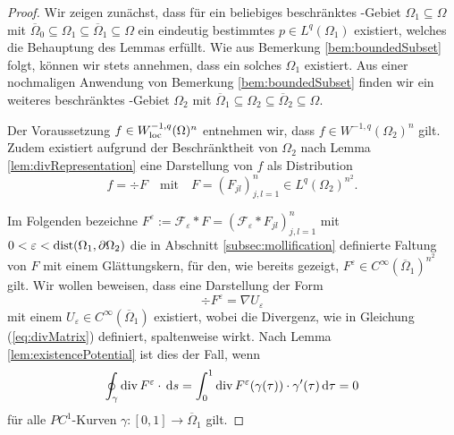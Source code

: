 \begin{proof}
  Wir zeigen zunächst, dass für ein beliebiges beschränktes \lipschitz\hyp{}Gebiet $\Omega_1 \subseteq \Omega$ mit $\overline\Omega_0 \subseteq \Omega_1 \subseteq \overline\Omega_1 \subseteq \Omega$ ein eindeutig bestimmtes $p \in L^q(\Omega_1)$ existiert, welches die Behauptung des Lemmas erfüllt.
  Wie aus Bemerkung \ref{bem:boundedSubset} folgt, können wir stets annehmen, dass ein solches $\Omega_1$ existiert.
  Aus einer nochmaligen Anwendung von Bemerkung \ref{bem:boundedSubset} finden wir ein weiteres beschränktes \lipschitz\hyp{}Gebiet $\Omega_2$ mit $\overline\Omega_1 \subseteq \Omega_2 \subseteq \overline\Omega_2 \subseteq \Omega$.

  Der Voraussetzung $f \in W_{\operatorname{loc}}^{-1,q}(\Omega)^n$ entnehmen wir, dass $f \in W^{-1,q}(\Omega_2)^n$ gilt. Zudem existiert aufgrund der Beschränktheit von $\Omega_2$ nach Lemma \ref{lem:divRepresentation} eine Darstellung von $f$ als Distribution
  \begin{equation}
    \label{eq:divRepresentation}
    f = \div F \quad\text{mit}\quad F = (F_{jl})_{j,l=1}^n \in L^q(\Omega_2)^{n^2}.
  \end{equation}

  Im Folgenden bezeichne $F^\varepsilon := \mathcal{F}_\varepsilon \ast F = (\mathcal{F}_\varepsilon \ast F_{jl})_{j,l=1}^n$ mit $0 < \varepsilon < \operatorname{dist}(\Omega_1, \partial\Omega_2)$ die in Abschnitt \ref{subsec:mollification} definierte Faltung von $F$ mit einem Glättungskern, für den, wie bereits gezeigt, $F^\varepsilon \in C^\infty(\overline\Omega_1)^{n^2}$ gilt.
  Wir wollen beweisen, dass eine Darstellung der Form
  \begin{equation}
    \label{eq:divNabla}
    \div F^\varepsilon = \nabla U_\varepsilon
  \end{equation}
  mit einem $U_\varepsilon \in C^\infty(\overline\Omega_1)$ existiert, wobei die Divergenz, wie in Gleichung (\ref{eq:divMatrix}) definiert, spaltenweise wirkt.
  Nach Lemma \ref{lem:existencePotential} ist dies der Fall, wenn
  $$
  \oint_\gamma \mathrm{div\,} F^\varepsilon \cdot \, {\operatorname{d}\!{s}} = \int_0^1 \mathrm{div\,} F^\varepsilon(\gamma(\tau))\cdot \gamma'(\tau) \, {\operatorname{d}\!{\tau}} = 0
  $$
  für alle $PC^1$-Kurven $\gamma \colon [0,1] \to \overline\Omega_1$ gilt.


\end{proof}
